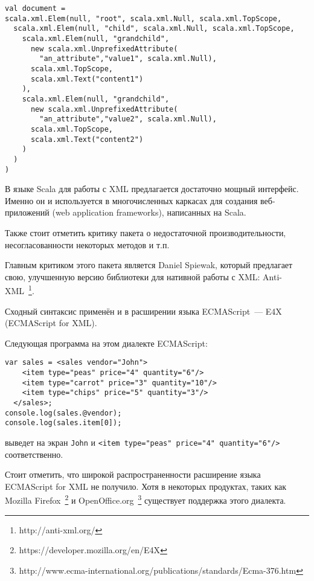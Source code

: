 \begin{lstlisting}[caption={Внутреннее представление XML литералов из~\ref{scala-xml-example}.}, label={scala-xml-example-internal}]
val document =
scala.xml.Elem(null, "root", scala.xml.Null, scala.xml.TopScope,
  scala.xml.Elem(null, "child", scala.xml.Null, scala.xml.TopScope,
    scala.xml.Elem(null, "grandchild",
      new scala.xml.UnprefixedAttribute(
        "an_attribute","value1", scala.xml.Null),
      scala.xml.TopScope,
      scala.xml.Text("content1")
    ),
    scala.xml.Elem(null, "grandchild",
      new scala.xml.UnprefixedAttribute(
        "an_attribute","value2", scala.xml.Null),
      scala.xml.TopScope,
      scala.xml.Text("content2")
    )
  )
) 
\end{lstlisting}

В языке Scala для работы с XML предлагается достаточно мощный интерфейс. Именно он и используется в многочисленных каркасах для создания веб-приложений (web application frameworks), написанных на Scala. \td

Также стоит отметить критику пакета  о недостаточной производительности, несогласованности некоторых методов и т.п.

Главным критиком этого пакета является Daniel Spiewak, который предлагает свою, улучшенную версию библиотеки для нативной работы с XML:
Anti-XML~\footnote{http://anti-xml.org/}.

Сходный синтаксис применён и в расширении языка ECMAScript~--- E4X~\cite{E4X} (ECMAScript for XML).

Следующая программа на этом диалекте ECMAScript:

\begin{lstlisting}[caption={Пример использования XML литеров в языке ECMAScript for XML.}, label=e4x-xml-example]
var sales = <sales vendor="John">
    <item type="peas" price="4" quantity="6"/>
    <item type="carrot" price="3" quantity="10"/>
    <item type="chips" price="5" quantity="3"/>
  </sales>;
console.log(sales.@vendor);
console.log(sales.item[0]);
\end{lstlisting}
выведет на экран \texttt{John} и \texttt{<item type="peas" price="4" quantity="6"/>} соответственно.

Стоит отметить, что широкой распространенности расширение языка ECMAScript for XML не получило.
Хотя в некоторых продуктах, таких как Mozilla Firefox~\footnote{https://developer.mozilla.org/en/E4X} и 
OpenOffice.org~\footnote{http://www.ecma-international.org/publications/standards/Ecma-376.htm} существует поддержка этого диалекта.

